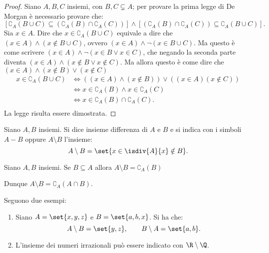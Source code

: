 \begin{proof}
    Siano \(A, B, C\) insiemi, con \(B,C \subsetneq A\); per provare la prima legge di De Morgan è necessario provare che:
    \[
        \left[\complement_A(B \cup C) \subseteq \left(\complement_A(B) \cap \complement_A(C)\right)\right]
        \land
        \left[\left(\complement_A(B) \cap \complement_A(C)\right) \subseteq \complement_A(B \cup C)\right].
    \]
    Sia \(x \in A\). Dire che \(x \in \complement_A(B \cup C)\) equivale a dire che \((x \in A) \land (x \notin B \cup C)\), ovvero \((x \in A) \land \neg(x \in B \cup C)\). Ma questo è come scrivere \((x \in A) \land \neg(x \in B \lor x \in C)\), che negando la seconda parte diventa \((x \in A) \land (x \notin B \lor x \notin C)\). Ma allora questo è come dire che \((x \in A) \land (x \notin B) \lor (x \notin C)\)
    \begin{equation*}
        \begin{split}
            x \in \complement_A(B \cup C)%
                &\iff \left((x \in A) \land (x \notin B)\right) \lor \left((x \in A)(x \notin C)\right)   \\
                &\iff x \in \complement_A(B) \land x \in \complement_A(C)                                 \\
                &\iff x \in \complement_A(B) \cap \complement_A(C).                                       \\
        \end{split}
    \end{equation*}
    La legge risulta essere dimostrata.
\end{proof}

\begin{definition}\label{def:insieme_differenza}
    Siano \(A, B\) insiemi. Si dice insieme differenza di \(A\) e \(B\) e si indica con i simboli \(A - B\) oppure \(A \setminus B\) l'insieme:
    \[
        A \setminus B = \set{x \in \isdiv{A}{x} \notin B}.
    \]
\end{definition}

\begin{remark}
    Siano \(A, B\) insiemi. Se \(B \subseteq A\) allora \(A \setminus B = \complement_A(B)\)
    
    Dunque \(A \setminus B = \complement_A(A \cap B)\).
\end{remark}

\begin{examples}
    Seguono due esempi:
    \begin{enumerate}
        \item Siano \(A = \set{x, y, z}\) e \(B = \set{a, b, x}\). Si ha che:
            \[
                A \setminus B = \set{y, z}, \qquad
                B \setminus A = \set{a, b}.
            \]
        \item L'insieme dei numeri irrazionali può essere indicato con \(\R \setminus \Q\).
    \end{enumerate}
\end{examples}

